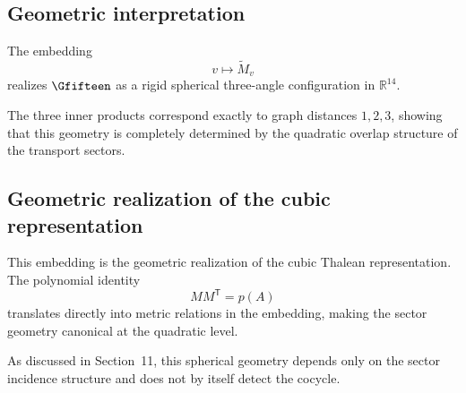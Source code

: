 \subsection{Geometric interpretation}

The embedding
\[
v \longmapsto \widetilde{M}_v
\]
realizes $\Gfifteen$ as a rigid spherical three-angle configuration in
$\mathbb{R}^{14}$.

The three inner products correspond exactly to graph distances
$1,2,3$, showing that this geometry is completely determined by the
quadratic overlap structure of the transport sectors.

\subsection{Geometric realization of the cubic representation}

This embedding is the geometric realization of the cubic Thalean
representation. The polynomial identity
\[
M M^{\mathsf T} = p(A)
\]
translates directly into metric relations in the embedding, making the
sector geometry canonical at the quadratic level.

As discussed in Section~11, this spherical geometry depends only on the
sector incidence structure and does not by itself detect the cocycle.
